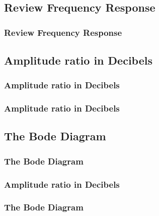 \documentclass[fleqn]{beamer} %
\newcommand{\sectionIIsubsectionItitle}{Review Frequency Response}
\newcommand{\sectionIIsubsectionIItitle}{Amplitude ratio in Decibels}
\newcommand{\sectionIIsubsectionIIItitle}{The Bode Diagram}
\begin{document}
		\subsection{\sectionIIsubsectionItitle}\label{sectionIIsubsectionI}

			\begin{frame}[label=sectionIIsubsectionI]
				\frametitle{\sectionIIsubsectionItitle}
				\bigskip

				
				\btVFill
			\end{frame}


		\subsection{\sectionIIsubsectionIItitle}\label{sectionIIsubsectionII}

			\begin{frame}

				\frametitle{\sectionIIsubsectionIItitle}
				\bigskip

				\btVFill 
			\end{frame}

			\begin{frame}

				\frametitle{\sectionIIsubsectionIItitle}
				\bigskip



				\btVFill 
			\end{frame}




		\subsection{\sectionIIsubsectionIIItitle}\label{sectionIIsubsectionIII}

			\begin{frame}
				\frametitle{\sectionIIsubsectionIIItitle}
				\bigskip

			
				\btVFill 
			\end{frame}	


			\begin{frame}
				\frametitle{\sectionIIsubsectionIItitle}
				\bigskip

				
				
				\btVFill 
			\end{frame}	


			\begin{frame}
				\frametitle{\sectionIIsubsectionIIItitle}
				\bigskip

				
				\btVFill 
			\end{frame}
\end{document}
